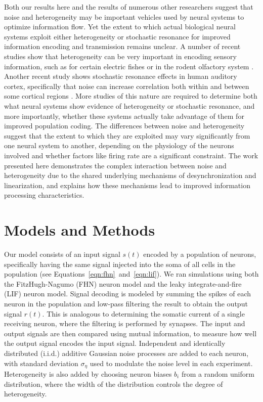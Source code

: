 \documentclass[letterpaper,11pt]{article}
\begin{document}
Both our results here and the results of numerous other researchers suggest that noise and heterogeneity may be important vehicles used by neural systems to optimize information flow.
Yet the extent to which actual biological neural systems exploit either heterogeneity or stochastic resonance for improved information encoding and transmission remains unclear.
A number of recent studies show that heterogeneity can be very important in encoding sensory information, such as for certain electric fishes \citep{Marsat2010} or in the rodent olfactory system \citep{Padmanabhan2010,Burton2012}. Another recent study shows stochastic resonance effects in human auditory cortex, specifically that noise can increase correlation both within and between some cortical regions \citep{Ward2010}. More studies of this nature are required to determine both what neural systems show evidence of heterogeneity or stochastic resonance, and more importantly, whether these systems actually take advantage of them for improved population coding.
The differences between noise and heterogeneity suggest that the extent to which they are exploited may vary significantly from one neural system to another, depending on the physiology of the neurons involved and whether factors like firing rate are a significant constraint.
The work presented here demonstrates the complex interaction between noise and heterogeneity due to the shared underlying mechanisms of desynchronization and linearization, and explains how these mechanisms lead to improved information processing characteristics.


\section{Models and Methods}
\label{scn:methods}

Our model consists of an input signal $s(t)$ encoded by a population of neurons, specifically having the same signal injected into the soma of all cells in the population (see Equations~\ref{eqn:fhn}~and~\ref{eqn:lif}). We ran simulations using both the FitzHugh-Nagumo (FHN) neuron model and the leaky integrate-and-fire (LIF) neuron model. Signal decoding is modeled by summing the spikes of each neuron in the population and low-pass filtering the result to obtain the output signal $r(t)$. This is analogous to determining the somatic current of a single receiving neuron, where the filtering is performed by synapses. The input and output signals are then compared using mutual information, to measure how well the output signal encodes the input signal. Independent and identically distributed (i.i.d.) additive Gaussian noise processes are added to each neuron, with standard deviation $\sigma_\eta$ used to modulate the noise level in each experiment. Heterogeneity is also added by choosing neuron biases $b_i$ from a random uniform distribution, where the width of the distribution controls the degree of heterogeneity.
\end{document}
